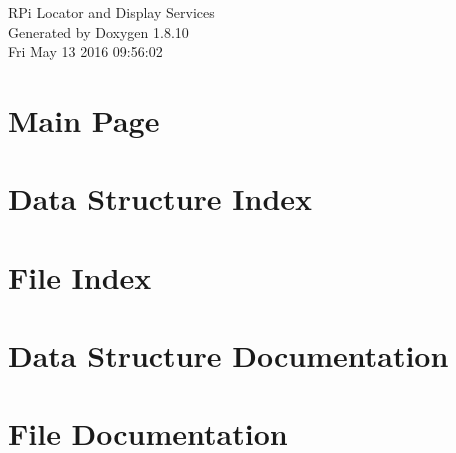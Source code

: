 \documentclass[twoside]{book}
\newcommand{\+}{\discretionary{\mbox{\scriptsize$\hookleftarrow$}}{}{}}
\newcommand{\clearemptydoublepage}{%
  \newpage{\pagestyle{empty}\cleardoublepage}%
}
\begin{document}
\hypersetup{pageanchor=false,
             bookmarks=true,
             bookmarksnumbered=true,
             pdfencoding=unicode
            }
\begin{titlepage}
\vspace*{7cm}
\begin{center}%
{\Large R\+Pi Locator and Display Services }\\
\vspace*{1cm}
{\large Generated by Doxygen 1.8.10}\\
\vspace*{0.5cm}
{\small Fri May 13 2016 09:56:02}\\
\end{center}
\end{titlepage}
\clearemptydoublepage
\tableofcontents
\clearemptydoublepage
{}
\hypersetup{pageanchor=true}

\chapter{Main Page}
\label{index}\hypertarget{index}{}
\chapter{Data Structure Index}

\chapter{File Index}

\chapter{Data Structure Documentation}














\chapter{File Documentation}


























\backmatter
\newpage
{}
\clearemptydoublepage
{}
\printindex
\end{document}
